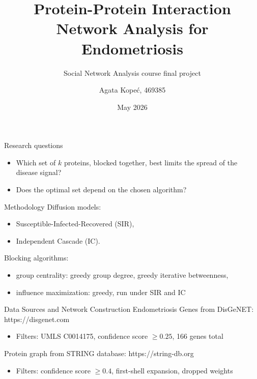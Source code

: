 \documentclass[aspectratio=169]{beamer}
\title{Protein-Protein Interaction Network Analysis for Endometriosis}
\subtitle{Social Network Analysis course final project}
\author{Agata Kope\'c, 469385}
\institute{Faculty of Mathematics, Informatics and Mechanics\\University of Warsaw}
\date{May 2026}
\begin{document}
\maketitle



\begin{frame}{Research questions}
  \begin{itemize}
    \item Which set of $k$ proteins, blocked together, best limits the spread of the disease signal?
    \item Does the optimal set depend on the chosen algorithm?
  \end{itemize}
\end{frame}




\begin{frame}{Methodology}
Diffusion models:
  \begin{itemize}
    \item Susceptible-Infected-Recovered (SIR),
    \item Independent Cascade (IC).
  \end{itemize}

  \vspace{0.5em}

Blocking algorithms:
  \begin{itemize}
    \item group centrality: greedy group degree, greedy iterative betweenness,
    \item influence maximization: greedy, run under SIR and IC
  \end{itemize}
\end{frame}




\begin{frame}{Data Sources and Network Construction}
  Endometriosis Genes from DisGeNET: https://disgenet.com
  \begin{itemize}
    \item Filters: UMLS C0014175, confidence score $\ge 0.25$, 166 genes total
  \end{itemize}
  Protein graph from STRING database: https://string-db.org
  \begin{itemize}
    \item Filters: confidence score $\ge 0.4$, first-shell expansion, dropped weights
  \end{itemize}
\end{frame}
\end{document}
